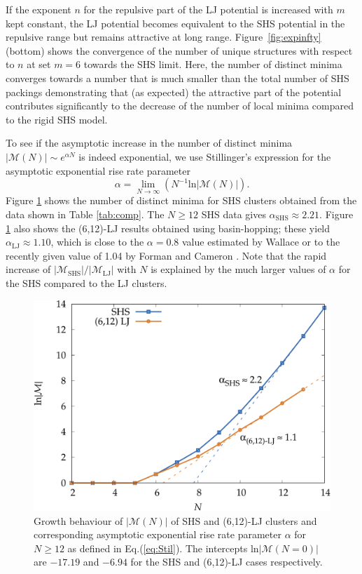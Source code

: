 If the exponent $n$ for the repulsive part of the LJ potential is increased
with $m$ kept constant, the LJ potential becomes equivalent to the SHS
potential in the repulsive range but remains attractive at long range.
Figure~\ref{fig:expinfty} (bottom) shows the convergence of the number of
unique structures with respect to $n$ at set $m=6$ towards the SHS limit. Here, the
number of distinct minima converges towards a number that is much smaller
than the total number of SHS packings demonstrating that (as expected) the
attractive part of the potential contributes significantly to the decrease of
the number of local minima compared to the rigid SHS model.

To see if the asymptotic increase in the number of distinct minima $|\mathcal{M}(N)| \sim e^{\alpha N}$ 
is indeed exponential, we use Stillinger's expression for the asymptotic exponential rise rate parameter \autocite{Stillinger_Exponentialmultiplicityinherent_1999}
\begin{equation} \label{eq:Stil}
\alpha = \lim_{N\rightarrow \infty} \left( N^{-1} \mathrm{ln} |\mathcal{M}(N)| \right).
\end{equation}
Figure \ref{fig:asympt} shows the number of distinct minima for SHS clusters
obtained from the data shown in Table \ref{tab:comp}.  The $N \geq 12$ SHS data
gives $\alpha_\mathrm{SHS}\approx 2.21$. Figure \ref{fig:asympt} also shows the
(6,12)-LJ results obtained using basin-hopping; these yield
$\alpha_\mathrm{LJ}\approx 1.10$, which is close to the $\alpha=0.8$ value
estimated by Wallace \autocite{Wallace-1997} or to the recently given value of 1.04
by Forman and Cameron \autocite{Forman_ModelingAggregationProcesses_2017}.  Note that the rapid increase of
$|\mathcal{M}_\mathrm{SHS}|/|\mathcal{M}_\mathrm{LJ}|$ with $N$ is explained by
the much larger values of $\alpha$ for the SHS compared to the LJ clusters.

\begin{figure}
    \centering
    \includegraphics[width=0.8\columnwidth]{kslj/growth.pdf}
    \caption{Growth behaviour of $|\mathcal{M}(N)|$ of SHS and (6,12)-LJ clusters and 
    corresponding asymptotic exponential rise rate parameter $\alpha$ for $N \geq 12$ as defined in Eq.(\ref{eq:Stil}).
    The intercepts ln$|\mathcal{M}(N=0)|$ are $-17.19$ and $-6.94$ for the SHS and (6,12)-LJ cases respectively.}
    \label{fig:asympt}
\end{figure}

